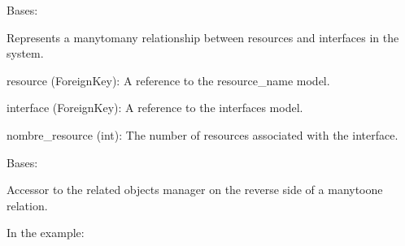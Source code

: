 \documentclass[letterpaper,10pt,english]{sphinxmanual}
\begin{document}

\begin{fulllineitems}
\label{\detokenize{app:app.models.association}}
\pysigstartsignatures
{}
\pysigstopsignatures
\sphinxAtStartPar
Bases: 

\sphinxAtStartPar
Represents a many\sphinxhyphen{}to\sphinxhyphen{}many relationship between resources and interfaces in the system.
\begin{description}
\sphinxAtStartPar
resource (ForeignKey): A reference to the resource\_name model.

\sphinxAtStartPar
interface (ForeignKey): A reference to the interfaces model.

\sphinxAtStartPar
nombre\_resource (int): The number of resources associated with the interface.

\end{description}

\begin{fulllineitems}
\label{\detokenize{app:app.models.association.DoesNotExist}}
\pysigstartsignatures
{}
\pysigstopsignatures
\sphinxAtStartPar
Bases: 

\end{fulllineitems}


\begin{fulllineitems}
\label{\detokenize{app:app.models.association.IO_list}}
\pysigstartsignatures
{}
\pysigstopsignatures
\sphinxAtStartPar
Accessor to the related objects manager on the reverse side of a
many\sphinxhyphen{}to\sphinxhyphen{}one relation.

\sphinxAtStartPar
In the example:

\begin{sphinxVerbatim}[commandchars=\\\{\}]
 
       
\end{sphinxVerbatim}


\end{fulllineitems}
\end{fulllineitems}
\end{document}
